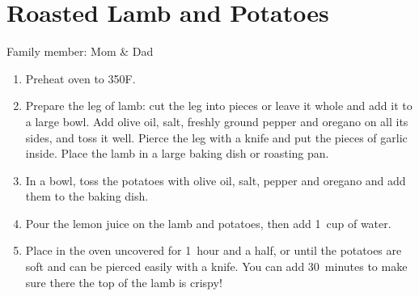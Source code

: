 \chapter{Roasted Lamb and Potatoes}
\label{ch:lambpotatoes}


Family member: Mom \& Dad

\begin{enumerate}
    \item Preheat oven to 350\degree F.
    \item Prepare the leg of lamb: cut the leg into pieces or leave it whole and add it to a large bowl.  Add olive oil, salt, freshly ground pepper and oregano on all its sides, and toss it well. Pierce the leg with a knife and put the pieces of garlic inside. Place the lamb in a large baking dish or roasting pan.
    \item In a bowl, toss the potatoes with olive oil, salt, pepper and oregano and add them to the baking dish.
    \item Pour the lemon juice on the lamb and potatoes, then add 1~cup of water.
    \item Place in the oven uncovered for 1~hour and a half, or until the potatoes are soft and can be pierced easily with a knife. You can add 30~minutes to make sure there the top of the lamb is crispy!
\end{enumerate}

